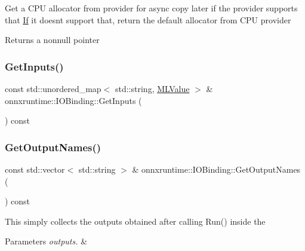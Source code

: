 Get a C\+PU allocator from provider for async copy later if the provider supports that \mbox{\hyperlink{classonnxruntime_1_1If}{If}} it doesn\textquotesingle{}t support that, return the default allocator from C\+PU provider \begin{DoxyReturn}{Returns}
a nonnull pointer 
\end{DoxyReturn}
\mbox{\label{classonnxruntime_1_1IOBinding_a97181d4c755d6588da31fe25d7dbed49}} 
\subsubsection{\texorpdfstring{Get\+Inputs()}{GetInputs()}}
{\footnotesize\ttfamily const std\+::unordered\+\_\+map$<$ std\+::string, \mbox{\hyperlink{classonnxruntime_1_1MLValue}{M\+L\+Value}} $>$ \& onnxruntime\+::\+I\+O\+Binding\+::\+Get\+Inputs (\begin{DoxyParamCaption}{ }\end{DoxyParamCaption}) const}

\mbox{\label{classonnxruntime_1_1IOBinding_a42617f235c1a5cc9b5efe8bfeabedfd1}} 
\subsubsection{\texorpdfstring{Get\+Output\+Names()}{GetOutputNames()}}
{\footnotesize\ttfamily const std\+::vector$<$ std\+::string $>$ \& onnxruntime\+::\+I\+O\+Binding\+::\+Get\+Output\+Names (\begin{DoxyParamCaption}{ }\end{DoxyParamCaption}) const}

This simply collects the outputs obtained after calling Run() inside the
\begin{DoxyParams}{Parameters}
{\em outputs.} & \\
\hline
\end{DoxyParams}
\mbox{\label{classonnxruntime_1_1IOBinding_a2200c675c3fa6c3aa11de0847082fe33}} 

